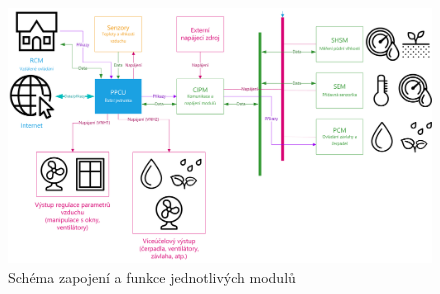 \begin{figure}[htbp]
    \centering
    \includegraphics[angle=90,origin=c,scale=0.7]{img/HARDWARE/MODULES.png}
    \caption{Schéma zapojení a funkce jednotlivých modulů}
    \label{fig:add-MODULES}
 \end{figure}

